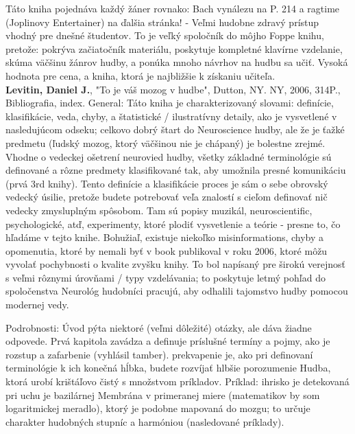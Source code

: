 \documentclass[11pt,a4paper%
]{article}
\begin{document}
Táto kniha pojednáva každý žáner rovnako: Bach vynálezu na P. 214 a ragtime (Joplinovy ​​Entertainer) na ďalšia stránka! - Veľmi hudobne zdravý prístup vhodný pre dnešné študentov. To je veľký spoločník do môjho Foppe knihu, pretože: pokrýva začiatočník materiálu, poskytuje kompletné klavírne vzdelanie, skúma väčšinu žánrov hudby, a ponúka mnoho návrhov na hudbu sa učiť. Vysoká hodnota pre cena, a kniha, ktorá je najbližšie k získaniu učiteľa.
\medskip\\
\textbf{Levitin, Daniel J.}, "To je váš mozog v hudbe", Dutton, NY. NY, 2006, 314P., Bibliografia, index.
General:
Táto kniha je charakterizovaný slovami: definície, klasifikácie, veda, chyby, a štatistické / ilustratívny detaily, ako je vysvetlené v nasledujúcom odseku; celkovo dobrý štart do Neuroscience hudby, ale že je ťažké predmetu (ľudský mozog, ktorý väčšinou nie je chápaný) je bolestne zrejmé. Vhodne o vedeckej ošetrení neurovied hudby, všetky základné terminológie sú
definované a rôzne predmety klasifikované tak, aby umožnila presné komunikáciu (prvá 3rd knihy). Tento definície a klasifikácie proces je sám o sebe obrovský vedecký úsilie, pretože budete potrebovať veľa znalostí s cieľom definovať nič vedecky zmysluplným spôsobom. Tam sú popisy muzikál, neuroscientific, psychologické, atď, experimenty, ktoré plodiť vysvetlenie a teórie - presne to, čo hľadáme v tejto knihe. Bohužiaľ, existuje niekoľko misinformations, chyby a opomenutia, ktoré by nemali byť v book publikoval v roku 2006, ktoré môžu vyvolať pochybnosti o kvalite zvyšku knihy. To bol napísaný pre širokú verejnosť s veľmi rôznymi úrovňami / typy vzdelávania; to poskytuje letmý pohľad do spoločenstva Neurológ hudobníci pracujú, aby odhalili tajomstvo hudby pomocou modernej vedy.

Podrobnosti:
Úvod pýta niektoré (veľmi dôležité) otázky, ale dáva žiadne odpovede. Prvá kapitola zavádza a definuje príslušné termíny a pojmy, ako je rozstup a zafarbenie (vyhlásil tamber). prekvapenie je, ako pri definovaní terminológie k ich konečná hĺbka, budete rozvíjať hlbšie porozumenie Hudba, ktorá urobí krištáľovo čistý s množstvom príkladov. Príklad: ihrisko je detekovaná pri uchu je bazilárnej Membrána v primeranej miere (matematikov by som logaritmickej meradlo), ktorý je podobne mapovaná do mozgu; to určuje charakter hudobných stupníc a harmóniou (nasledované príklady).
\end{document}

